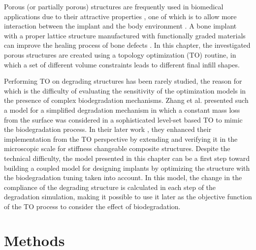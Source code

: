 Porous (or partially porous) structures are frequently used in biomedical applications due to their attractive properties , one of which is to allow more interaction between the implant and the body environment \cite{Birmingham2012}. A bone implant with a proper lattice structure manufactured with functionally graded materials can improve the healing process of bone defects \cite{Mahmoud2017}. In this chapter, the investigated porous structures are created using a topology optimization (\gls{TO}) routine, in which a set of different volume constraints leads to different final infill shapes. 

Performing \gls{TO} on degrading structures has been rarely studied, the reason for which is the difficulty of evaluating the sensitivity of the optimization models in the presence of complex biodegradation mechanisms. Zhang et al. \cite{Zhang2021} presented such a model for a simplified degradation mechanism in which a constant mass loss from the surface was considered in a sophisticated level-set based \gls{TO} to mimic the biodegradation process. In their later work \cite{Zhang2021a}, they enhanced their implementation from the \gls{TO} perspective by extending and verifying it in the microscopic scale for stiffness changeable composite structures. Despite the technical difficulty, the model presented in this chapter can be a first step toward building a coupled model for designing implants by optimizing the structure with the biodegradation tuning taken into account. In this model, the change in the compliance of the degrading structure is calculated in each step of the degradation simulation, making it possible to use it later as the objective function of the \gls{TO} process to consider the effect of biodegradation.


\section{Methods}

